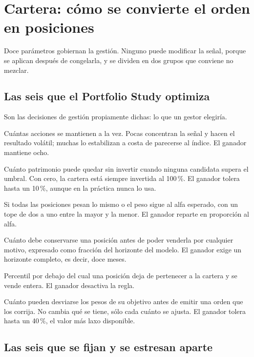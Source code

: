 \section{Cartera: cómo se convierte el orden en posiciones}

Doce parámetros gobiernan la gestión. Ninguno puede modificar la señal, porque se aplican después de
congelarla, y se dividen en dos grupos que conviene no mezclar.

\subsection{Las seis que el Portfolio Study optimiza}

Son las decisiones de gestión propiamente dichas: lo que un gestor elegiría.

\begin{description}[leftmargin=0cm,style=nextline,itemsep=0.5em]
  \item[Número de posiciones] Cuántas acciones se mantienen a la vez. Pocas concentran la señal y
  hacen el resultado volátil; muchas lo estabilizan a costa de parecerse al índice. El ganador
  mantiene ocho.
  \item[Tope de efectivo] Cuánto patrimonio puede quedar sin invertir cuando ninguna candidata
  supera el umbral. Con cero, la cartera está siempre invertida al 100\,\%. El ganador tolera hasta
  un 10\,\%, aunque en la práctica nunca lo usa.
  \item[Reparto de pesos] Si todas las posiciones pesan lo mismo o el peso sigue al alfa esperado,
  con un tope de dos a uno entre la mayor y la menor. El ganador reparte en proporción al alfa.
  \item[Permanencia mínima] Cuánto debe conservarse una posición antes de poder venderla por
  cualquier motivo, expresado como fracción del horizonte del modelo. El ganador exige un horizonte
  completo, es decir, doce meses.
  \item[Suelo de cobertura] Percentil por debajo del cual una posición deja de pertenecer a la
  cartera y se vende entera. El ganador desactiva la regla.
  \item[Tolerancia a la deriva] Cuánto pueden desviarse los pesos de su objetivo antes de emitir una
  orden que los corrija. No cambia qué se tiene, sólo cada cuánto se ajusta. El ganador tolera hasta
  un 40\,\%, el valor más laxo disponible.
\end{description}

\subsection{Las seis que se fijan y se estresan aparte}

